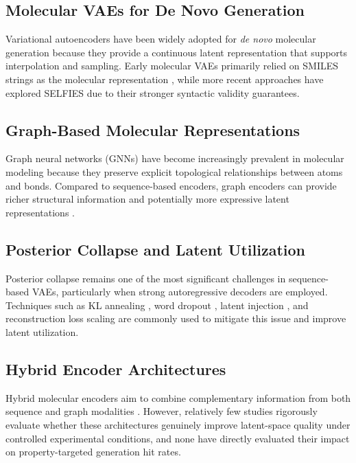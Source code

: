 \documentclass[conference]{IEEEtran}
\begin{document}
\subsection{Molecular VAEs for De Novo Generation}

Variational autoencoders have been widely adopted for \textit{de novo} molecular generation \cite{molecular_generation_vae_citation} because they provide a continuous latent representation that supports interpolation and sampling. Early molecular VAEs primarily relied on SMILES strings as the molecular representation \cite{smiles_vae_citation}, while more recent approaches have explored SELFIES \cite{selfies_vae_citation} due to their stronger syntactic validity guarantees.

\subsection{Graph-Based Molecular Representations}

Graph neural networks (GNNs) \cite{gnn_review_citation} have become increasingly prevalent in molecular modeling because they preserve explicit topological relationships between atoms and bonds. Compared to sequence-based encoders, graph encoders can provide richer structural information and potentially more expressive latent representations \cite{graph_molecular_representation_advantages_citation}.

\subsection{Posterior Collapse and Latent Utilization}

Posterior collapse \cite{posterior_collapse_citation} remains one of the most significant challenges in sequence-based VAEs, particularly when strong autoregressive decoders are employed. Techniques such as KL annealing \cite{kl_annealing_citation}, word dropout \cite{word_dropout_citation}, latent injection \cite{latent_injection_citation}, and reconstruction loss scaling \cite{reconstruction_loss_scaling_citation} are commonly used to mitigate this issue and improve latent utilization.

\subsection{Hybrid Encoder Architectures}

Hybrid molecular encoders aim to combine complementary information from both sequence and graph modalities \cite{hybrid_encoder_review_citation}. However, relatively few studies rigorously evaluate whether these architectures genuinely improve latent-space quality under controlled experimental conditions, and none have directly evaluated their impact on property-targeted generation hit rates.
\end{document}
